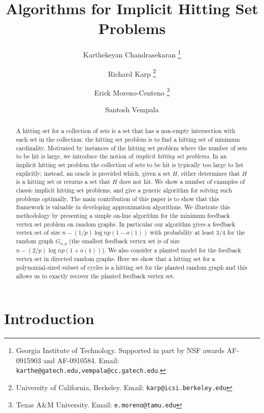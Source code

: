 \documentclass[11pt]{article}
\begin{document}
\title{\Large Algorithms for Implicit Hitting Set Problems}
\author{Karthekeyan Chandrasekaran \thanks{Georgia Institute of Technology. Supported in part by NSF awards AF-0915903 and AF-0910584. Email: {\tt karthe@gatech.edu,vempala@cc.gatech.edu}. }\\
\and Richard Karp \thanks{University of California, Berkeley. Email: {\tt karp@icsi.berkeley.edu}}\\
\and Erick Moreno-Centeno \thanks{Texas A\&M University. Email: {\tt e.moreno@tamu.edu}}\\
\and Santosh Vempala \footnotemark[1]}
\date{}

\maketitle

\begin{abstract}
A hitting set for a collection of sets is a set that has a non-empty intersection with each set in the collection; the hitting set problem is to find a hitting set of minimum cardinality. Motivated by instances of the hitting set problem where the number of sets to be hit is large, we introduce the notion of \emph{implicit hitting set problems}. In an implicit hitting set problem the collection of sets to be hit is typically too large to list explicitly; instead, an oracle
is provided which, given a set $H$, either determines that $H$ is a hitting set or returns a set that $H$ does not hit. We show a number of examples of classic implicit hitting set problems, and give a generic algorithm for solving such problems optimally. The main contribution of this paper is to show that this framework is valuable in developing approximation algorithms. We illustrate this methodology by presenting a simple on-line algorithm for the minimum feedback vertex set problem on random graphs. In particular our algorithm gives a feedback vertex set of size $n-(1/p)\log{np}(1-o(1))$ with probability at least $3/4$ for the random graph $G_{n,p}$ (the smallest feedback vertex set is of size $n-(2/p)\log{np}(1+o(1))$). We also consider a planted model for the feedback vertex set in directed random graphs. Here we show that a hitting set for a polynomial-sized subset of cycles is a hitting set for the planted random graph and this allows us to exactly recover the planted feedback vertex set.
\end{abstract}

\section{Introduction}
\end{document}
